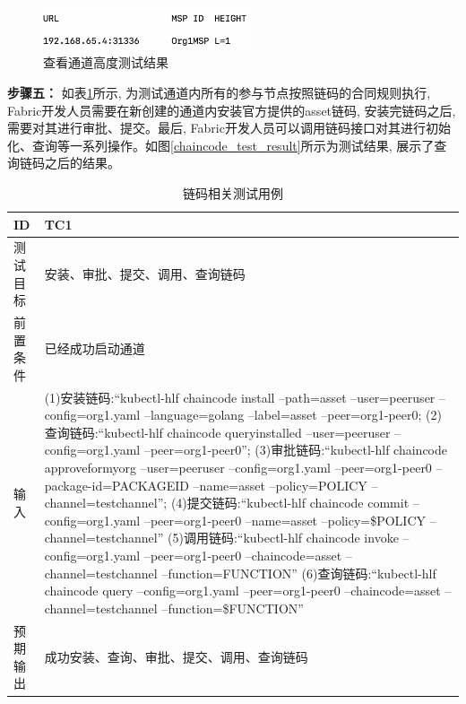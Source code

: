 \begin{figure}[h] %
    \centering %
    \includegraphics[width=0.55\textwidth]{FIGs/chapter5/channel.png} %
    \caption{查看通道高度测试结果} %
    \label{channel_test_result} %
\end{figure}%

\textbf{步骤五：} 如表\ref{chaincode_test}所示, 为测试通道内所有的参与节点按照链码的合同规则执行, Fabric开发人员需要在新创建的通道内安装官方提供的asset\footnotemark[1]链码, 安装完链码之后, 需要对其进行审批、提交。最后, Fabric开发人员可以调用链码接口对其进行初始化、查询等一系列操作。如图\ref{chaincode_test_result}所示为测试结果, 展示了查询链码之后的结果。

{\footnotesize
\begin{longtable}[h]{m{60pt}|m{280pt}}
    \caption[链码相关测试用例]{链码相关测试用例} \label{chaincode_test}\\
        \hline  
        ID&TC1\\
        \hline
        测试目标&安装、审批、提交、调用、查询链码\\
        \hline
        前置条件&已经成功启动通道\\
        \hline
        输入& (1)安装链码:“kubectl-hlf chaincode install --path=asset --user=peeruser --config=org1.yaml --language=golang --label=asset --peer=org1-peer0;
        \newline (2)查询链码:“kubectl-hlf chaincode queryinstalled --user=peeruser --config=org1.yaml --peer=org1-peer0”;
        \newline (3)审批链码:“kubectl-hlf chaincode approveformyorg --user=peeruser --config=org1.yaml --peer=org1-peer0 --package-id=PACKAGEID --name=asset --policy=POLICY --channel=testchannel”;
        \newline (4)提交链码:“kubectl-hlf chaincode commit --config=org1.yaml --peer=org1-peer0 --name=asset --policy=\$POLICY --channel=testchannel”
        \newline (5)调用链码:“kubectl-hlf chaincode invoke --config=org1.yaml --peer=org1-peer0 --chaincode=asset --channel=testchannel --function=FUNCTION”
        \newline (6)查询链码:“kubectl-hlf chaincode query --config=org1.yaml --peer=org1-peer0 --chaincode=asset --channel=testchannel --function=\$FUNCTION”\\
        \hline 
        预期输出& 成功安装、查询、审批、提交、调用、查询链码\\
        \hline
    \end{longtable} 
}


